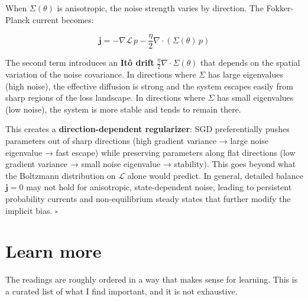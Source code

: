 \documentclass[11pt]{article}
\begin{document}
\begin{solution}[ex:td-6c]
When \(\Sigma(\theta)\) is anisotropic, the noise strength
varies by direction. The Fokker-Planck current becomes:

\[\mathbf{j} = -\nabla\mathcal{L}\,p - \frac{\eta}{2}\nabla\cdot(\Sigma(\theta)\,p)\]

The second term introduces an \textbf{Itô drift}
\(\frac{\eta}{2}\nabla\cdot\Sigma(\theta)\) that depends on the spatial
variation of the noise covariance. In directions where \(\Sigma\) has
large eigenvalues (high noise), the effective diffusion is strong and
the system escapes easily from sharp regions of the loss landscape. In
directions where \(\Sigma\) has small eigenvalues (low noise), the
system is more stable and tends to remain there.

This creates a \textbf{direction-dependent regularizer}: SGD
preferentially pushes parameters out of sharp directions (high gradient
variance → large noise eigenvalue → fast escape) while preserving
parameters along flat directions (low gradient variance → small noise
eigenvalue → stability). This goes beyond what the Boltzmann
distribution on \(\mathcal{L}\) alone would predict. In general,
detailed balance \(\mathbf{j} = 0\) may not hold for anisotropic,
state-dependent noise, leading to persistent probability currents and
non-equilibrium steady states that further modify the implicit bias.
\(\square\)
\end{solution}

\section*{Learn more}

The readings are roughly ordered in a way that makes sense for learning. This is a curated list of what I find important, and it is not exhaustive.
\end{document}
